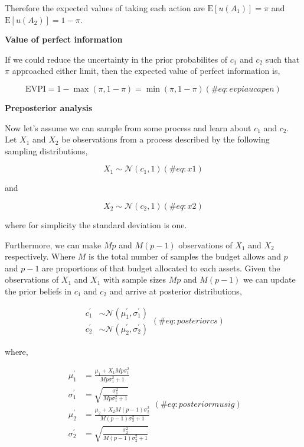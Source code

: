 Therefore the expected values of taking each action are
\(\mathrm{E}[u(A_1)]=\pi\) and \(\mathrm{E}[u(A_2)]=1-\pi\).

\textbf{Value of perfect information}

If we could reduce the uncertainty in the prior probabilites of \(c_1\)
and \(c_2\) such that \(\pi\) approached either limit, then the expected
value of perfect information is,

\begin{equation}
\mathrm{EVPI}=1-\max(\pi, 1-\pi)=\min(\pi, 1-\pi)
(\#eq:evpiaucapen)
\end{equation}

\textbf{Preposterior analysis}

Now let's assume we can sample from some process and learn about \(c_1\)
and \(c_2\).\\
Let \(X_1\) and \(X_2\) be observations from a process described by the
following sampling distributions,

\begin{equation}
X_1\sim\mathcal{N}\left(c_1, 1\right)
(\#eq:x1)
\end{equation}

and

\begin{equation}
X_2\sim\mathcal{N}\left(c_2, 1\right)
(\#eq:x2)
\end{equation}

where for simplicity the standard deviation is one.

Furthermore, we can make \(Mp\) and \(M(p-1)\) observations of \(X_1\)
and \(X_2\) respectively. Where \(M\) is the total number of samples the
budget allows and \(p\) and \(p-1\) are proportions of that budget
allocated to each assets. Given the observations of \(X_1\) and \(X_1\)
with sample sizes \(Mp\) and \(M(p-1)\) we can update the prior beliefs
in \(c_1\) and \(c_2\) and arrive at posterior distributions,

\begin{equation} 
\begin{aligned}
c_1^\prime &\sim \mathcal{N}(\mu^\prime_1, \sigma^\prime_1)\\
c_2^\prime &\sim \mathcal{N}(\mu^\prime_2, \sigma^\prime_2)
\end{aligned}
(\#eq:posteriorcs)
\end{equation}

where,

\begin{equation}
\begin{aligned}
\mu^\prime_1 &= \frac{\mu_1 + X_1Mp\sigma^2_1}{Mp\sigma^2_1 + 1}\\
\sigma^\prime_1 &= \sqrt{\frac{\sigma^2_1}{Mp\sigma^2_1 + 1}}\\
\mu^\prime_2 &= \frac{\mu_2 + X_2M(p-1)\sigma^2_2}{M(p-1)\sigma^2_2 + 1}\\
\sigma^\prime_2 &= \sqrt{\frac{\sigma^2_2}{M(p-1)\sigma^2_2 + 1}}
\end{aligned}
(\#eq:posteriormusig)
\end{equation}

